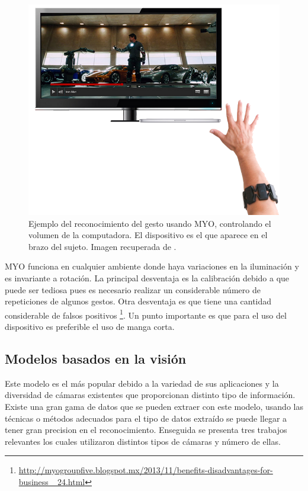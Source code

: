 \begin{figure}[h!]
\begin{center}
\includegraphics[scale=.5]{./Figures/MYO.png}
\end{center}
\caption{Ejemplo del reconocimiento del gesto usando MYO, controlando el volumen de la computadora. El dispositivo es el que aparece en el brazo del sujeto. Imagen recuperada de \protect\footnotemark{}.}
\label{fig:Myo}
\end{figure}


MYO funciona en cualquier ambiente donde haya variaciones en la iluminación y es invariante a rotación.
La principal desventaja es la calibración debido a que puede ser tediosa pues es necesario realizar un considerable número de repeticiones de algunos gestos. Otra desventaja es que tiene una cantidad considerable de falsos positivos \footnote{ \url{http://myogroupfive.blogspot.mx/2013/11/benefits-disadvantages-for-business\_ 24.html}}. Un punto importante es que para el uso del dispositivo es preferible el uso de manga corta. 


\subsection{Modelos basados en la visión}   

Este modelo es el más popular debido a la variedad de sus aplicaciones y la diversidad de cámaras existentes que proporcionan distinto tipo de información. Existe una gran gama de datos que se pueden extraer con este modelo, usando las técnicas o métodos adecuados para el tipo de datos extraído se puede llegar a tener gran precision en el reconocimiento. Enseguida se presenta tres trabajos relevantes los cuales utilizaron distintos tipos de cámaras y número de ellas. 

